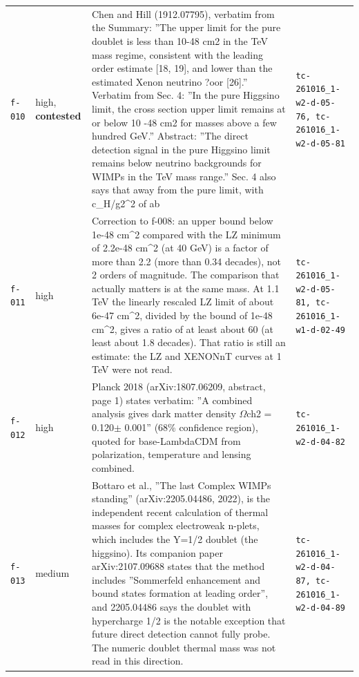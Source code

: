 \documentclass[11pt,a4paper]{article}
\begin{document}
\begin{longtable}{@{}p{}p{}p{}p{}@{}}
\texttt{f-010} & high, \textbf{contested} & Chen and Hill (1912.07795), verbatim from the Summary: ''The upper limit for the pure doublet is less than 10-48 cm2 in the TeV mass regime, consistent with the leading order estimate [18, 19], and lower than the estimated Xenon neutrino ?oor [26].'' Verbatim from Sec. 4: ''In the pure Higgsino limit, the cross section upper limit remains at or below 10 -48 cm2 for masses above a few hundred GeV.'' Abstract: ''The direct detection signal in the pure Higgsino limit remains below neutrino backgrounds for WIMPs in the TeV mass range.'' Sec. 4 also says that away from the pure limit, with c\_H/g2\textasciicircum{}2 of ab & \texttt{tc-261016\_\allowbreak{}1-w2-d-05-76,\allowbreak{} tc-261016\_\allowbreak{}1-w2-d-05-81} \\
\texttt{f-011} & high & Correction to f-008: an upper bound below 1e-48 cm\textasciicircum{}2 compared with the LZ minimum of 2.2e-48 cm\textasciicircum{}2 (at 40 GeV) is a factor of more than 2.2 (more than 0.34 decades), not 2 orders of magnitude. The comparison that actually matters is at the same mass. At 1.1 TeV the linearly rescaled LZ limit of about 6e-47 cm\textasciicircum{}2, divided by the bound of 1e-48 cm\textasciicircum{}2, gives a ratio of at least about 60 (at least about 1.8 decades). That ratio is still an estimate: the LZ and XENONnT curves at 1 TeV were not read. & \texttt{tc-261016\_\allowbreak{}1-w2-d-05-81,\allowbreak{} tc-261016\_\allowbreak{}1-w1-d-02-49} \\
\texttt{f-012} & high & Planck 2018 (arXiv:1807.06209, abstract, page 1) states verbatim: ''A combined analysis gives dark matter density $\Omega$ch2 = 0.120$\pm$ 0.001'' (68\% confidence region), quoted for base-LambdaCDM from polarization, temperature and lensing combined. & \texttt{tc-261016\_\allowbreak{}1-w2-d-04-82} \\
\texttt{f-013} & medium & Bottaro et al., ''The last Complex WIMPs standing'' (arXiv:2205.04486, 2022), is the independent recent calculation of thermal masses for complex electroweak n-plets, which includes the Y=1/2 doublet (the higgsino). Its companion paper arXiv:2107.09688 states that the method includes ''Sommerfeld enhancement and bound states formation at leading order'', and 2205.04486 says the doublet with hypercharge 1/2 is the notable exception that future direct detection cannot fully probe. The numeric doublet thermal mass was not read in this direction. & \texttt{tc-261016\_\allowbreak{}1-w2-d-04-87,\allowbreak{} tc-261016\_\allowbreak{}1-w2-d-04-89} \\

\end{longtable}
\end{document}
